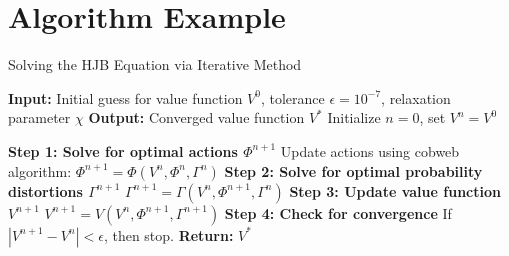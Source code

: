 \documentclass{article}%
\begin{document}
%
\normalsize%
\section{Algorithm Example}%
\label{sec:AlgorithmExample}%

    \begin{algorithm}
    \caption{Solving the HJB Equation via Iterative Method}
    \begin{algorithmic}[1]
        \STATE \textbf{Input:} Initial guess for value function $V^0$, tolerance $\epsilon = 10^{-7}$, relaxation parameter $\chi$
        \STATE \textbf{Output:} Converged value function $V^*$
        \STATE Initialize $n = 0$, set $V^n = V^0$
        
            \STATE \textbf{Step 1: Solve for optimal actions $\Phi^{n+1}$}
            \STATE Update actions using cobweb algorithm: $\Phi^{n+1} = \Phi(V^n,\Phi^n,\Gamma^n)$
            \STATE \textbf{Step 2: Solve for optimal probability distortions $\Gamma^{n+1}$}
            \STATE $\Gamma^{n+1} = \Gamma(V^n,\Phi^{n+1},\Gamma^n)$
            \STATE \textbf{Step 3: Update value function $V^{n+1}$}
            \STATE $V^{n+1} = V(V^n,\Phi^{n+1},\Gamma^{n+1})$
            \STATE \textbf{Step 4: Check for convergence}
            \STATE If $|V^{n+1} - V^n| < \epsilon$, then stop.
        \ENDWHILE
        \STATE \textbf{Return:} $V^*$
    \end{algorithmic}
    \end{algorithm}
    

%
\end{document}

